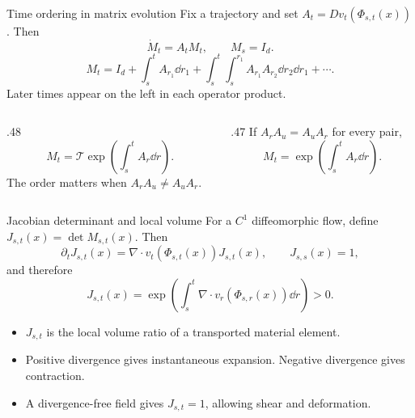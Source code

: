 \begin{frame}[t]{Time ordering in matrix evolution}
\hypertarget{main:timeordering}{}
Fix a trajectory and set $A_t=Dv_t(\Phi_{s,t}(x))$. Then
\begin{equation*}
  \dot M_t=A_tM_t,\qquad M_s=I_d.
\end{equation*}
\begin{equation*}
  M_t=I_d+\int_s^t A_{r_1}\dd r_1
  +\int_s^t\int_s^{r_1}A_{r_1}A_{r_2}\dd r_2\dd r_1+\cdots.
\end{equation*}
Later times appear on the left in each operator product.
\begin{columns}[T,onlytextwidth]
  \begin{column}{.48\textwidth}
    \begin{equation*}
      M_t=\mathcal T\exp\!\left(\int_s^t A_r\dd r\right).
    \end{equation*}
    The order matters when $A_rA_u\ne A_uA_r$.
  \end{column}
  \begin{column}{.47\textwidth}
    If $A_rA_u=A_uA_r$ for every pair,
    \begin{equation*}
      M_t=\exp\!\left(\int_s^t A_r\dd r\right).
    \end{equation*}
  \end{column}
\end{columns}
\end{frame}

\begin{frame}[t]{Jacobian determinant and local volume}
\hypertarget{main:jacobian}{}
For a $C^1$ diffeomorphic flow, define $J_{s,t}(x)=\det M_{s,t}(x)$. Then
\begin{equation*}
  \partial_t J_{s,t}(x)
  =\nabla\cdot v_t(\Phi_{s,t}(x))J_{s,t}(x),\qquad J_{s,s}(x)=1,
\end{equation*}
and therefore
\begin{equation*}
  \boxed{J_{s,t}(x)=\exp\!\left(\int_s^t\nabla\cdot v_r(\Phi_{s,r}(x))\dd r\right)>0.}
\end{equation*}
\begin{itemize}\setlength{\itemsep}{7pt}
  \item $J_{s,t}$ is the local volume ratio of a transported material element.
  \item Positive divergence gives instantaneous expansion. Negative divergence gives contraction.
  \item A divergence-free field gives $J_{s,t}=1$, allowing shear and deformation.
\end{itemize}
\end{frame}


